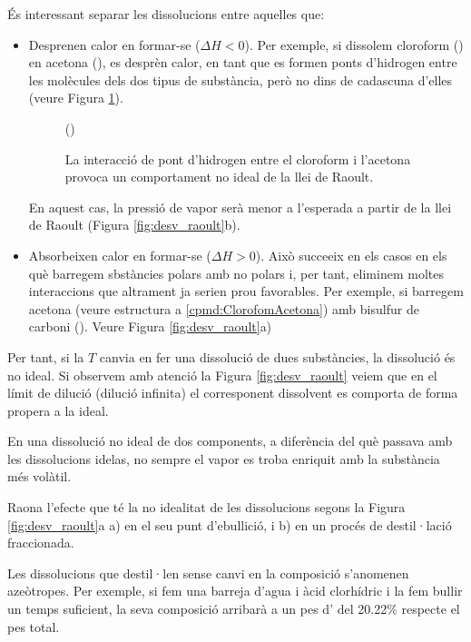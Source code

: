 És interessant separar les dissolucions entre aquelles que:
\begin{itemize}
\item Desprenen calor en formar-se ($\Delta H <0$). Per exemple, si dissolem cloroform () en acetona (), es desprèn calor, en tant que es formen ponts d'hidrogen entre les molècules dels dos tipus de substància, però no dins de cadascuna d'elles (veure Figura \ref{fig:CloroformAcetona}).
\begin{figure}
  \centering
{}
()\par
  \caption{La interacció de pont d'hidrogen entre el cloroform i l'acetona provoca un comportament no ideal de la llei de Raoult.}
  \label{fig:CloroformAcetona}
\end{figure}
En aquest cas, la pressió de vapor serà menor a l'esperada a partir de la llei de Raoult (Figura \ref{fig:desv_raoult}b). 
\item Absorbeixen calor en formar-se ($\Delta H > 0$). Això succeeix en els casos en els què barregem sbstàncies polars amb no polars i, per tant, eliminem moltes interaccions que altrament ja serien prou favorables. Per exemple, si barregem acetona (veure estructura a \ref{cpmd:ClorofomAcetona}) amb bisulfur de carboni (). Veure Figura \ref{fig:desv_raoult}a)
\end{itemize} 
Per tant, si la $T$ canvia en fer una dissolució de dues substàncies, la dissolució és no ideal.
Si observem amb atenció la Figura \ref{fig:desv_raoult} veiem que en el límit de dilució (dilució infinita) el corresponent dissolvent es comporta de forma propera a la ideal.

En una dissolució no ideal de dos components, a diferència del què passava amb les dissolucions idelas, no sempre el vapor es troba enriquit amb la substància més volàtil. 

\begin{exr}
Raona l'efecte que té la no idealitat de les dissolucions segons la Figura \ref{fig:desv_raoult}a a) en el seu punt d'ebullició, i b) en un procés de destil·lació fraccionada.
\end{exr}

Les dissolucions que destil·len sense canvi en la composició s'anomenen azeòtropes. Per exemple, si fem una barreja d'agua i àcid clorhídric i la fem bullir un temps suficient, la seva composició arribarà a un pes d' del 20.22\% respecte el pes total.


